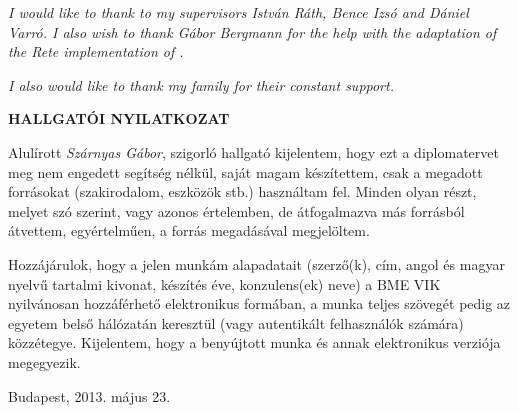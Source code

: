 \emph{I would like to thank to my supervisors István Ráth, Bence Izsó and Dániel Varró. I also wish to thank G\'abor Berg\-mann for the help with the adaptation of the Rete implementation of \incquery.}

\emph{I also would like to thank my family for their constant support.} \vfill \clearpage

\begin{center}
\large
\textbf{HALLGATÓI NYILATKOZAT}\\
\end{center}

Alulírott \emph{Szárnyas Gábor}, szigorló hallgató kijelentem, hogy ezt a diplomatervet meg nem engedett segítség nélkül, saját magam készítettem, csak a megadott forrásokat (szakirodalom, eszközök stb.) használtam fel. Minden olyan részt, melyet szó szerint, vagy azonos értelemben, de átfogalmazva más forrásból átvettem, egyértelműen, a forrás megadásával megjelöltem.

Hozzájárulok, hogy a jelen munkám alapadatait (szerző(k), cím, angol és magyar nyel\-vű tartalmi kivonat, készítés éve, konzulens(ek) neve) a BME VIK nyilvánosan hozzáférhető elektronikus formában, a munka teljes szövegét pedig az egyetem belső hálózatán keresztül (vagy autentikált felhasználók számára) közzétegye. Kijelentem, hogy a benyújtott munka és annak elektronikus verziója megegyezik.

\begin{flushleft}
\vspace*{1cm}
Budapest, 2013. május 23.
\end{flushleft}

\begin{flushright}
 \vspace*{1cm}
 \makebox[7cm]{\rule{6cm}{.4pt}}\\
 \\
\end{flushright}
\thispagestyle{empty}

\vfill
\clearpage
\thispagestyle{empty} %

